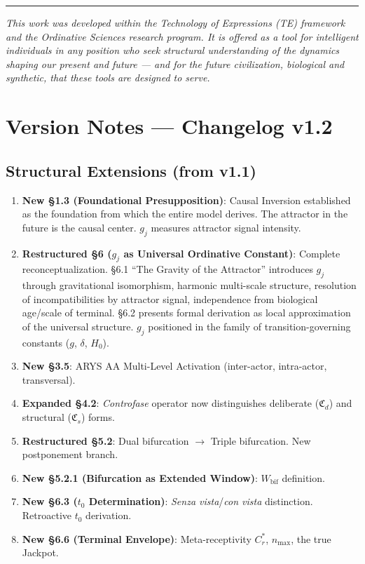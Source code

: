 \documentclass[12pt,a4paper]{article}
\newcommand{\reagmeta}{C_r^{*}}
\newcommand{\gj}{g_j}
\newcommand{\nmax}{n_{\mathrm{max}}}
\newcommand{\CFd}{\mathfrak{C}_d}        %
\newcommand{\CFs}{\mathfrak{C}_s}        %
\begin{document}
\vspace{1em}

\begin{center}
\rule{0.5\textwidth}{0.4pt}
\end{center}

\vspace{1em}

\noindent\textit{This work was developed within the Technology of Expressions (TE) framework and the Ordinative Sciences research program. It is offered as a tool for intelligent individuals in any position who seek structural understanding of the dynamics shaping our present and future --- and for the future civilization, biological and synthetic, that these tools are designed to serve.}


\section*{Version Notes --- Changelog v1.2}

\subsection*{Structural Extensions (from v1.1)}

\begin{enumerate}[label=\textbf{\arabic*.}]
    \item \textbf{New §1.3 (Foundational Presupposition)}: Causal Inversion established as the foundation from which the entire model derives. The attractor in the future is the causal center. $\gj$ measures attractor signal intensity.
    \item \textbf{Restructured §6 ($\gj$ as Universal Ordinative Constant)}: Complete reconceptualization. §6.1 ``The Gravity of the Attractor'' introduces $\gj$ through gravitational isomorphism, harmonic multi-scale structure, resolution of incompatibilities by attractor signal, independence from biological age/scale of terminal. §6.2 presents formal derivation as local approximation of the universal structure. $\gj$ positioned in the family of transition-governing constants ($g$, $\delta$, $H_0$).
    \item \textbf{New §3.5}: ARYS AA Multi-Level Activation (inter-actor, intra-actor, transversal).
    \item \textbf{Expanded §4.2}: \textit{Controfase} operator now distinguishes deliberate ($\CFd$) and structural ($\CFs$) forms.
    \item \textbf{Restructured §5.2}: Dual bifurcation $\to$ Triple bifurcation. New postponement branch.
    \item \textbf{New §5.2.1 (Bifurcation as Extended Window)}: $W_{\mathrm{bif}}$ definition.
    \item \textbf{New §6.3 ($t_0$ Determination)}: \emph{Senza vista}/\emph{con vista} distinction. Retroactive $t_0$ derivation.
    \item \textbf{New §6.6 (Terminal Envelope)}: Meta-receptivity $\reagmeta$, $\nmax$, the true Jackpot.
\end{enumerate}
\end{document}
